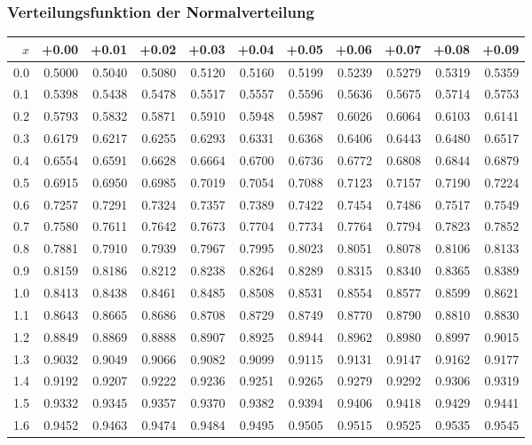 \subsubsection{Verteilungsfunktion der Normalverteilung}
	\label{tbl_NormVerteilung}

\begin{tabular}{|r|rrrrrrrrrr|}
	\hline
	$x$&+0.00&+0.01&+0.02&+0.03&+0.04&+0.05&+0.06&+0.07&+0.08&+0.09\\
	\hline
	\rowcolor[gray]{.9}
	0.0&0.5000&0.5040&0.5080&0.5120&0.5160&0.5199&0.5239&0.5279&0.5319&0.5359\\
	0.1&0.5398&0.5438&0.5478&0.5517&0.5557&0.5596&0.5636&0.5675&0.5714&0.5753\\
	\rowcolor[gray]{.9}
	0.2&0.5793&0.5832&0.5871&0.5910&0.5948&0.5987&0.6026&0.6064&0.6103&0.6141\\
	0.3&0.6179&0.6217&0.6255&0.6293&0.6331&0.6368&0.6406&0.6443&0.6480&0.6517\\
	\rowcolor[gray]{.9}
	0.4&0.6554&0.6591&0.6628&0.6664&0.6700&0.6736&0.6772&0.6808&0.6844&0.6879\\
	0.5&0.6915&0.6950&0.6985&0.7019&0.7054&0.7088&0.7123&0.7157&0.7190&0.7224\\
	\rowcolor[gray]{.9}
	0.6&0.7257&0.7291&0.7324&0.7357&0.7389&0.7422&0.7454&0.7486&0.7517&0.7549\\
	0.7&0.7580&0.7611&0.7642&0.7673&0.7704&0.7734&0.7764&0.7794&0.7823&0.7852\\
	\rowcolor[gray]{.9}
	0.8&0.7881&0.7910&0.7939&0.7967&0.7995&0.8023&0.8051&0.8078&0.8106&0.8133\\
	0.9&0.8159&0.8186&0.8212&0.8238&0.8264&0.8289&0.8315&0.8340&0.8365&0.8389\\
	\rowcolor[gray]{.9}
	1.0&0.8413&0.8438&0.8461&0.8485&0.8508&0.8531&0.8554&0.8577&0.8599&0.8621\\
	1.1&0.8643&0.8665&0.8686&0.8708&0.8729&0.8749&0.8770&0.8790&0.8810&0.8830\\
	\rowcolor[gray]{.9}
	1.2&0.8849&0.8869&0.8888&0.8907&0.8925&0.8944&0.8962&0.8980&0.8997&0.9015\\
	1.3&0.9032&0.9049&0.9066&0.9082&0.9099&0.9115&0.9131&0.9147&0.9162&0.9177\\
	\rowcolor[gray]{.9}
	1.4&0.9192&0.9207&0.9222&0.9236&0.9251&0.9265&0.9279&0.9292&0.9306&0.9319\\
	1.5&0.9332&0.9345&0.9357&0.9370&0.9382&0.9394&0.9406&0.9418&0.9429&0.9441\\
	\rowcolor[gray]{.9}
	1.6&0.9452&0.9463&0.9474&0.9484&0.9495&0.9505&0.9515&0.9525&0.9535&0.9545\\

\end{tabular}
